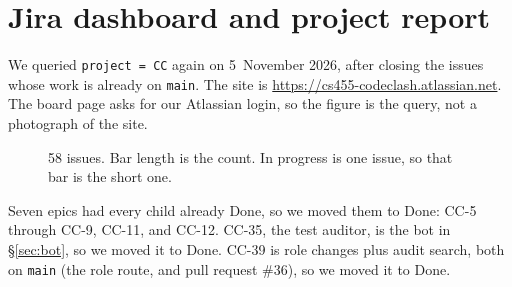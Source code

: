 \documentclass[11pt,a4paper]{article}
\begin{document}
\section{Jira dashboard and project report}
\label{sec:jira}

We queried \texttt{project = CC} again on 5~November 2026, after closing the issues whose work is already on \texttt{main}. The site is \url{https://cs455-codeclash.atlassian.net}. The board page asks for our Atlassian login, so the figure is the query, not a photograph of the site.

\begin{figure}[ht]
\centering
{}
\caption{58 issues. Bar length is the count. In progress is one issue, so that bar is the short one.}
\label{fig:jira}
\end{figure}

Seven epics had every child already Done, so we moved them to Done: CC-5 through CC-9, CC-11, and CC-12. CC-35, the test auditor, is the bot in \S\ref{sec:bot}, so we moved it to Done. CC-39 is role changes plus audit search, both on \texttt{main} (the role route, and pull request \#36), so we moved it to Done.
\end{document}
